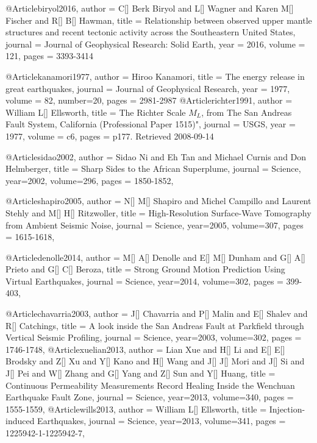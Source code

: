 @Article{biryol2016,
  author = 	 {C[] Berk Biryol and L[] Wagner and Karen M[] Fischer and R[] B[] Hawman},
  title = 	 {Relationship between observed upper mantle structures and recent tectonic activity across the Southeastern United States},
  journal = 	 {Journal of Geophysical Research: Solid Earth},
  year = 	 2016,
  volume = 121,
  pages =	 {3393-3414}
}

@Article{kanamori1977,
  author = 	 {Hiroo Kanamori},
  title = 	 {The energy release in great earthquakes},
  journal = 	 {Journal of Geophysical Research},
  year = 	 1977,
  volume = 82,
  number=20,
  pages =	 {2981-2987}
}
@Article{richter1991,
  author = 	 {William L[] Ellsworth},
  title = 	 {The Richter Scale $M_L$, from The San Andreas Fault System, California (Professional Paper 1515)"},
  journal = 	 {USGS},
  year = 	 1977,
  volume = c6,
  pages =	 {p177. Retrieved 2008-09-14}
}



@Article{sidao2002,
  author =	 {Sidao Ni and Eh Tan and Michael Curnis and Don Helmberger},
  title =	 {Sharp Sides to the African Superplume},
  journal =	 {Science},
  year=2002,
  volume=296,
  pages =	 {1850-1852},
}

@Article{shapiro2005,
  author =	 {N[] M[] Shapiro and Michel Campillo and Laurent Stehly and M[] H[] Ritzwoller},
  title =	 {High-Resolution Surface-Wave Tomography from Ambient Seismic Noise},
  journal =	 {Science},
  year=2005,
  volume=307,
  pages =	 {1615-1618},
}

@Article{denolle2014,
  author =	 {M[] A[] Denolle and E[] M[] Dunham and G[] A[] Prieto and G[] C[] Beroza},
  title =	 {Strong Ground Motion Prediction Using Virtual Earthquakes},
  journal =	 {Science},
  year=2014,
  volume=302,
  pages =	 {399-403},
}

@Article{chavarria2003,
  author =	 {J[] Chavarria and P[] Malin and E[] Shalev and R[] Catchings},
  title =	 {A look inside the San Andreas Fault at Parkfield through Vertical Seismic Profiling},
  journal =	 {Science},
  year=2003,
  volume=302,
  pages =	 {1746-1748},
}
@Article{xuelian2013,
  author =	 {Lian Xue and H[] Li and E[] E[] Brodsky and Z[] Xu and Y[] Kano and H[] Wang and J[] J[] Mori and J[] Si and J[] Pei and W[] Zhang and G[] Yang and Z[] Sun and Y[] Huang},
  title =	 {Continuous Permeability Measurements Record Healing Inside the Wenchuan Earthquake Fault Zone},
  journal =	 {Science},
  year=2013,
  volume=340,
  pages =	 {1555-1559},
}
@Article{wills2013,
  author =	 {William L[] Ellsworth},
  title =	 {Injection-induced Earthquakes},
  journal =	 {Science},
  year=2013,
  volume=341,
  pages =	 {1225942-1-1225942-7},
}

